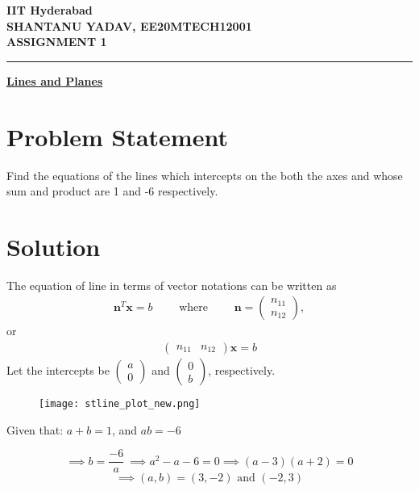 \documentclass[12pt]{article}
\newcommand{\myvec}[1]{\ensuremath{\begin{pmatrix}#1\end{pmatrix}}}
\begin{document}
\begin{center}
	{\Large \bf IIT Hyderabad} \\ \vspace{2ex}
	{\large \bf SHANTANU YADAV, EE20MTECH12001 }\\
	\vspace{2ex}
	{\large \bf ASSIGNMENT 1} \\
\end{center}
	\hrule

\vspace{2ex}
\begin{center}
{\underline{\Large \bf Lines and Planes}}
\end{center}

\section*{Problem Statement}
Find the equations of the lines which intercepts on the both the axes and whose sum and product are 1 and -6 respectively.

\section*{Solution}
The equation of line in terms of vector notations can be written as
\begin{align}
	{\mathbf{n}^T}{\mathbf x} = b     \qquad \text{ where } \qquad 
	\mathbf{n} = \myvec{n_{11} \\  n_{12}}, 
\end{align}
	or
\begin{align}
	\myvec{n_{11} &  n_{12}} \mathbf{x} = b	\label{eq2}
\end{align}
Let the intercepts be $\myvec{a \\ 0}$ and $\myvec{0 \\ b}$, respectively.

\begin{figure}[htbp]
\centering
\texttt{[image: stline\_plot\_new.png]}
\caption{}
\end{figure}

\noindent
Given that: \qquad \quad $ a + b = 1 $, \qquad and \qquad \quad $ ab = -6$ 

\begin{equation*}
\implies b = \frac{-6}{a} \  
\implies a^2 - a -6 =0
\implies (a-3)(a+2)=0
\end{equation*}
\begin{equation}
	\implies (a,b)=(3,-2) \text{ and } (-2,3)
\end{equation}
\end{document}
